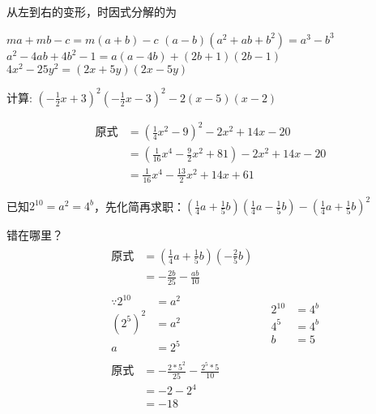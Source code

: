 \documentclass[answers]{exam}
\begin{document}
\begin{questions}
\question
  从左到右的变形，时因式分解的为
  \begin{choices}
    \choice $ma+mb-c=m(a+b)-c$
    \choice $(a-b)(a^2+ab+b^2)=a^3-b^3$
    \choice $a^2-4ab+4b^2-1=a(a-4b)+(2b+1)(2b-1)$
    \choice $4x^2-25y^2=(2x+5y)(2x-5y)$
  \end{choices}

\question
  计算: $(-\frac{1}{2}x + 3)^2(-\frac{1}{2}x-3)^2-2(x-5)(x-2)$

  \begin{solution}
    \[
      \begin{aligned}
        \mbox{原式} &= (\frac{1}{4}x^2 - 9)^2 - 2x^2 + 14x - 20 \\
        &= (\frac{1}{16}x^4 - \frac{9}{2}x^2 + 81) - 2x^2 + 14x - 20 \\
        &= \frac{1}{16}x^4 - \frac{13}{2}x^2 + 14x + 61
      \end{aligned}
    \]
  \end{solution}

\question
  已知$2^{10}=a^2=4^b$，先化简再求职：$(\frac{1}{4}a +
  \frac{1}{5}b)(\frac{1}{4}a-\frac{1}{5}b)-(\frac{1}{4}a+\frac{1}{5}b)^2$

  \begin{solution}
    错在哪里？
    \[
      \begin{aligned}
        & \begin{aligned}
          \mbox{原式} &= (\frac{1}{4}a + \frac{1}{5}b)(-\frac{2}{5}b) \\
          &= - \frac{2b}{25} - \frac{ab}{10}
        \end{aligned} \\
        & \begin{aligned}
          \because  2^{10} &= a ^2 \\
          (2^5)^2 &= a^2 \\
          a &= 2^5
        \end{aligned}
        & \begin{aligned}
          2^{10} &= 4^b \\
          4^5 &= 4^{b} \\
          b &= 5
        \end{aligned} \\
        & \begin{aligned}
          \mbox{原式} &= - \frac{2*5^2}{25} - \frac{2^5*5}{10} \\
          &= -2 - 2^4 \\
          &= -18
        \end{aligned}
      \end{aligned}
    \]
  \end{solution}


\end{questions}
\end{document}
